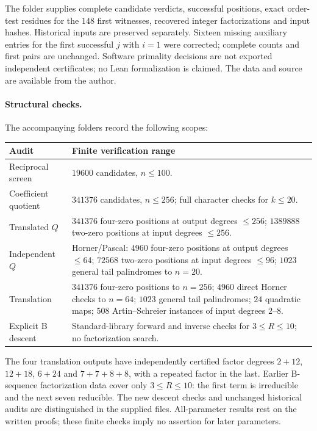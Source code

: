 \documentclass[11pt]{article}
\theoremstyle{definition}
\theoremstyle{remark}
\begin{document}
The folder  supplies complete candidate
verdicts, successful positions, exact order-test residues for the $148$
first witnesses, recovered integer factorizations and input hashes.
Historical inputs are preserved separately. Sixteen missing auxiliary
entries for the first successful $j$ with $i=1$ were corrected; complete
counts and first pairs are unchanged. Software primality decisions
are not exported independent certificates; no Lean formalization is claimed.
The data and source are available from the author.

\paragraph{Structural checks.}
The accompanying  folders record the following scopes:
\begin{center}\small
\begin{tabular}{p{}p{}}
\toprule
Audit & Finite verification range\\
\midrule
Reciprocal screen & $19600$ candidates, $n\le100$.\\
Coefficient quotient & $341376$ candidates, $n\le256$; full character checks for $k\le20$.\\
Translated $Q$ & $341376$ four-zero positions at output degrees $\le256$; $1389888$ two-zero positions at input degrees $\le256$.\\
Independent $Q$ & Horner/Pascal: $4960$ four-zero positions at output degrees $\le64$; $72568$ two-zero positions at input degrees $\le96$; $1023$ general tail palindromes to $n=20$.\\
Translation & $341376$ four-zero positions to $n=256$; $4960$ direct Horner checks to $n=64$; $1023$ general tail palindromes; $24$ quadratic maps; $508$ Artin--Schreier instances of input degrees $2$--$8$.\\
Explicit B descent & Standard-library forward and inverse checks for $3\le R\le10$; no factorization search.\\
\bottomrule
\end{tabular}
\end{center}
The four translation outputs have independently certified factor degrees
$2+12$, $12+18$, $6+24$ and $7+7+8+8$, with a repeated factor in the last.
Earlier B-sequence factorization data cover only $3\le R\le10$:
the first term is irreducible and the next seven reducible.
The new descent checks and unchanged historical audits are distinguished
in the supplied files. All-parameter results rest on the written proofs;
these finite checks imply no assertion for later parameters.
\end{document}

